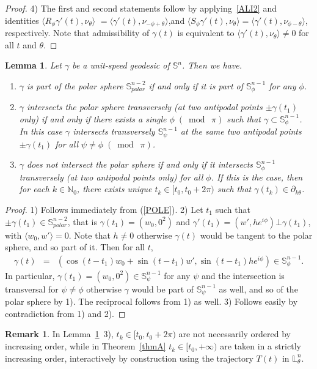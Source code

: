\documentclass[11pt,a4paper,times]{amsart}
\theoremstyle{plain}
\newtheorem{lemma}[thm]{Lemma}
\theoremstyle{definition}
\newtheorem{remark}{Remark}[section]
\numberwithin{equation}{section}
\newcommand{\N}{\mathbb{N}}
\newcommand{\Se}{\mathbb{S}}
\newcommand{\lune}[2]{\mathbb{L}^{#1}_{#2}}
\newcommand{\txtg}{\textcolor{green}}
\newcommand{\modu}[1]{\;(\bmod\;{#1})}
\begin{document}
{\begin{proof}
 4) The first and second statements follow by applying~\eqref{ALI2} and identities $\langle R_{\phi}\gamma'(t), \nu_{\theta}\rangle$
 $= \langle \gamma'(t), \nu_{-\phi+\theta}\rangle$,and  $\langle S_{\phi}\gamma'(t), \nu_{\theta}\rangle= \langle \gamma'(t), \nu_{\phi- \theta}\rangle$, respectively.
 Note that admissibility of $\gamma(t)$ is equivalent to $ \langle \gamma'(t), \nu_{\theta}\rangle \neq 0$ for all $t$  and $\theta$.
\end{proof}


 \begin{lemma}\label{rigidity}
Let $\gamma$ be a unit-speed geodesic of $\Se^n$. Then we have.
\begin{enumerate}[{\rm 1)}]
\item  $\gamma$ is part of the polar sphere $\Se^{n-2}_{polar}$ if and only if it is part of  $\Se^{n-1}_{\phi}$ for any $\phi$.\\[-3mm]
\item $\gamma$ intersects the polar sphere  transversely (at two antipodal points $\pm\gamma(t_1)$ {only})
 if and only if  there exists a single $\phi\modu{\pi}$ such that $\gamma\subset \Se^{n-1}_{\phi}$. In this case $\gamma$ intersects transversely $\Se^{n-1}_{\psi}$ at the same two antipodal points $\pm\gamma(t_1)$ for all $\psi\neq \phi\modu{\pi}$.\\[-3mm]
 \item $\gamma$ does not intersect the polar sphere
 if and only if it intersects $\Se^{n-1}_{\phi}$
 transversely (at two antipodal points {only}) for all $\phi$. If this is the case, then for each $k\in \N_0$, there exists unique  $t_k\in[t_0, t_0+2\pi)$ such that $\gamma(t_k)\in \partial_{k\theta}$.
 \end{enumerate}
\end{lemma}
\begin{proof}
1) Follows immediately from (\ref{POLE}).
2) Let $t_1$ such that $\pm \gamma(t_1)\in \Se^{n-2}_{polar}$, that is $\gamma(t_1)=(w_0,0^2)$ and $\gamma'(t_1)=(w', he^{i\phi})\bot \gamma(t_1)$, with $\langle w_0,w'\rangle =0$.  Note that $h\neq 0$ otherwise $\gamma(t)$ would be tangent to the polar sphere, and so   part of it.   Then for all $t$,
\begin{eqnarray*}
\gamma(t)
&=& (\cos(t-t_1)w_0+ \sin(t-t_1)w',  \sin(t-t_1)he^{i\phi})\in \Se^{n-1}_{\phi}.
\end{eqnarray*}
In particular, $\gamma(t_1)=(w_0,0^2) \in \Se^{n-1}_{\psi}$ for any $\psi$ and the intersection is transversal for $\psi\neq \phi$
otherwise $\gamma$ would be part of  $\Se^{n-1}_{\psi}$ as well, and so of the polar sphere by 1).  The reciprocal follows from 1) as well.
3) Follows easily by contradiction from 1) and 2).
\end{proof}
%
  \begin{remark} In Lemma~\ref{rigidity}~3), $t_k\in [t_0,t_0+2\pi)$ are not necessarily ordered by increasing order, while in
  Theorem~\ref{thmA} $t_k\in [t_0, +\infty)$ are taken in a strictly increasing order, interactively by construction using the
  trajectory $T(t)$ in $\lune{n}{\theta}$.
  \end{remark}
}
\end{document}
